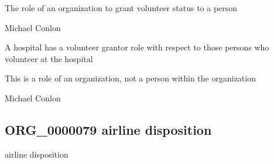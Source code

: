 \documentclass[letterpaper,10pt,english]{sphinxmanual}
\begin{document}
\begin{sphinxShadowBox}

\sphinxAtStartPar
{\hyperref[\detokenize{doc-BFO_0000023::doc}]{}}
\end{sphinxShadowBox}

\begin{sphinxShadowBox}

\sphinxAtStartPar
The role of an organization to grant volunteer status to a person
\end{sphinxShadowBox}

\begin{sphinxShadowBox}

\sphinxAtStartPar
Michael Conlon 
\end{sphinxShadowBox}

\begin{sphinxShadowBox}

\sphinxAtStartPar
A hospital has a volunteer grantor role with respect to those persons who volunteer at the hospital
\end{sphinxShadowBox}

\begin{sphinxShadowBox}

\sphinxAtStartPar
This is a role of an organization, not a person within the organization
\end{sphinxShadowBox}

\begin{sphinxShadowBox}

\sphinxAtStartPar
Michael Conlon 
\end{sphinxShadowBox}
\begin{quote}

\ignorespaces \end{quote}


\subsection{ORG\_0000079 \sphinxhyphen{} airline disposition}
\label{\detokenize{doc-ORG_0000079:org-0000079-airline-disposition}}\label{\detokenize{doc-ORG_0000079:index-0}}\label{\detokenize{doc-ORG_0000079::doc}}
\begin{sphinxShadowBox}

\sphinxAtStartPar
airline disposition
\end{sphinxShadowBox}
\end{document}
